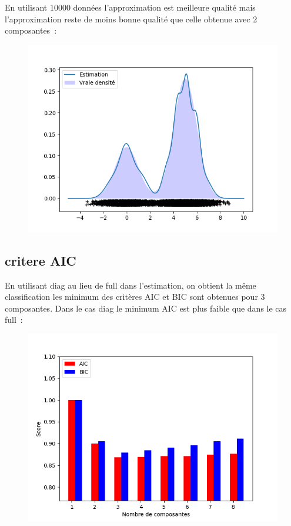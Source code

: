 \documentclass[12pt]{scrartcl} %
\begin{document}
\newline 
En utilisant 10000 données l'approximation est meilleure qualité mais l'approximation reste de moins bonne qualité que celle obtenue avec 2 composantes~:
\newline
\begin{figure}[!h]
 \centering 
\includegraphics[scale=.3]{densite8cpt10000.png}
\end{figure}
\newline  
\subsection{critere AIC}
En utilisant diag au lieu de full dans l'estimation, on obtient la même classification les minimum des critères AIC et BIC sont obtenues pour 3 composantes. Dans le cas diag le minimum AIC est plus faible que dans le cas full~:
\newline
\begin{figure}[!h]
 \centering 
\includegraphics[scale=.4]{barAIC.png}
\end{figure}
\newline  
\end{document}

